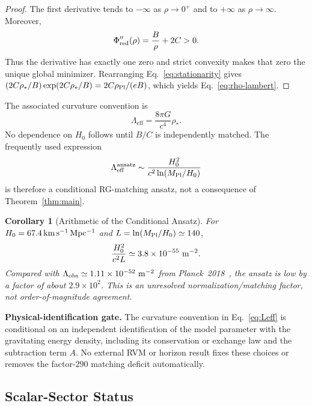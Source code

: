 \documentclass[12pt,a4paper]{article}
\theoremstyle{definition}
\theoremstyle{plain}
\newtheorem{corollary}[definition]{Corollary}
\theoremstyle{remark}
\newcommand{\Leff}{\Lambda_{\mathrm{eff}}}
\begin{document}
\begin{proof}
The first derivative tends to \(-\infty\) as \(\rho\to0^+\) and to
\(+\infty\) as \(\rho\to\infty\).  Moreover,
\begin{equation}
 \Phi_{\rm red}''(\rho)=\frac{B}{\rho}+2C>0 .
\end{equation}
Thus the derivative has exactly one zero and strict convexity makes that zero
the unique global minimizer.  Rearranging Eq.~\eqref{eq:stationarity} gives
\((2C\rho_\ast/B)\exp(2C\rho_\ast/B)=
2C\rho_{\rm Pl}/(eB)\), which yields Eq.~\eqref{eq:rho-lambert}.
\end{proof}

The associated curvature convention is
\begin{equation}\label{eq:Leff}
 \Leff=\frac{8\pi G}{c^4}\rho_\ast .
\end{equation}
No dependence on \(H_0\) follows until \(B/C\) is independently matched.
The frequently used expression
\begin{equation}\label{eq:bound}
 \Leff^{\rm ansatz}
 \sim\frac{H_0^2}{c^2\ln(M_{\rm Pl}/H_0)}
\end{equation}
is therefore a conditional RG-matching ansatz, not a consequence of
Theorem~\ref{thm:main}.

\begin{corollary}[Arithmetic of the Conditional Ansatz]\label{cor:numerical}
For \(H_0=67.4\,{\rm km\,s^{-1}\,Mpc^{-1}}\) and
\(L=\ln(M_{\rm Pl}/H_0)\simeq140\),
\begin{equation}
 \frac{H_0^2}{c^2L}\simeq3.8\times10^{-55}\ {\rm m}^{-2}.
\end{equation}
Compared with
\(\Lambda_{\rm obs}\simeq1.11\times10^{-52}\ {\rm m}^{-2}\)
from Planck~2018~\cite{Planck2018}, the ansatz is low by a factor of about
\(2.9\times10^2\).  This is an unresolved normalization/matching factor, not
order-of-magnitude agreement.
\end{corollary}

\noindent\textbf{Physical-identification gate.}
The curvature convention in Eq.~\eqref{eq:Leff} is conditional on an
independent identification of the model parameter with the gravitating
energy density, including its conservation or exchange law and the
subtraction term $A$. No external RVM or horizon result fixes these
choices or removes the factor-$290$ matching deficit automatically.

\subsection{Scalar-Sector Status}\label{sec:scalar-tensor}
\end{document}
